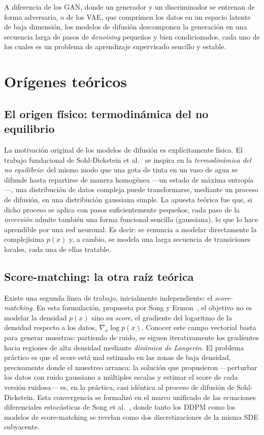 A diferencia de los GAN, donde un generador y un discriminador se
entrenan de forma adversaria, o de los VAE, que comprimen los datos
en un espacio latente de baja dimensión, los modelos de difusión
descomponen la generación en una secuencia larga de pasos de
\emph{denoising} pequeños y bien condicionados, cada uno de los cuales
es un problema de aprendizaje supervisado sencillo y estable. 

\section{Orígenes teóricos}
\label{sec:por-que-difusion}

\subsection{El origen físico: termodinámica del no equilibrio}
\label{subsec:origen-fisico}

La motivación original de los modelos de difusión es explícitamente
física. El trabajo fundacional de Sohl-Dickstein et
al.~\cite{sohldickstein2015} se inspira en la \emph{termodinámica del
no equilibrio}: del mismo modo que una gota de tinta en un vaso de
agua se difunde hasta repartirse de manera homogénea —un estado de
máxima entropía—, una distribución de datos
compleja puede transformarse, mediante un proceso de difusión, en una
distribución gaussiana simple. La apuesta teórica fue que, si dicho
proceso se aplica con pasos suficientemente pequeños, cada paso de la
\emph{inversión} admite también una forma funcional sencilla
(gaussiana), lo que lo hace aprendible por una red neuronal. Es
decir: se renuncia a modelar directamente la complejísima $p(x)$ y, a
cambio, se modela una larga secuencia de transiciones locales, cada
una de ellas tratable.

\subsection{Score-matching: la otra raíz teórica}
\label{subsec:score-matching}

Existe una segunda línea de trabajo, inicialmente independiente: el
\emph{score-matching}. En esta formulación, propuesta por Song y
Ermon~\cite{song2019scorematching}, el objetivo no es modelar la
densidad $p(x)$ sino su \emph{score}, el gradiente del logaritmo de
la densidad respecto a los datos, $\nabla_x \log p(x)$. Conocer este
campo vectorial basta para generar muestras: partiendo de ruido, se
siguen iterativamente los gradientes hacia regiones de alta densidad
mediante \emph{dinámica de Langevin}. El problema práctico es que el
score está mal estimado en las zonas de baja densidad, precisamente
donde el muestreo arranca; la solución que propusieron —perturbar los
datos con ruido gaussiano a múltiples escalas y estimar el score de
cada versión ruidosa— es, en la práctica, casi idéntica al proceso de
difusión de Sohl-Dickstein. Esta convergencia se formalizó en el
marco unificado de las ecuaciones diferenciales estocásticas de Song
et al.~\cite{song2021sde}, donde tanto los DDPM como los modelos de
score-matching se revelan como dos discretizaciones de la misma SDE
subyacente.

